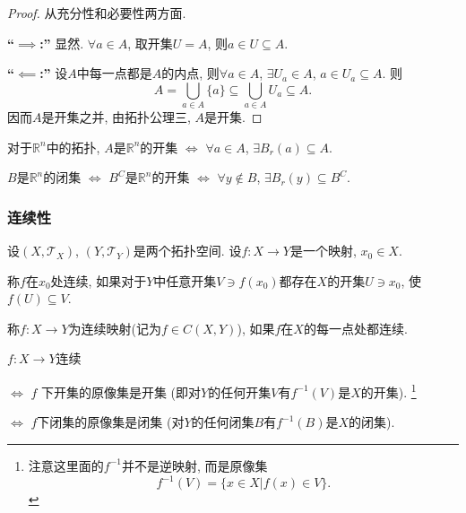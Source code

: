 \begin{proof}
    从充分性和必要性两方面.

    \textbf{``$\implies$:''} 显然. $\forall a \in A$, 取开集$U = A$, 则$a \in U \subseteq  A$.

    \textbf{``$\impliedby$:''} 设$A$中每一点都是$A$的内点, 则$\forall a \in A$, $\exists U_a \in A$, $a \in U_a \subseteq A$. 则
    \begin{equation}
      A = \bigcup_{a \in A} \{ a \} \subseteq \bigcup_{a \in A} U_a \subseteq A.
    \end{equation}
    因而$A$是开集之并, 由拓扑公理三, $A$是开集.
\end{proof}

对于$\mathbb{R}^{n}$中的拓扑, $A$是$\mathbb{R}^{n}$的开集 $\iff$ $\forall a \in A$, $\exists B_{r}\left( a \right) \subseteq A$.

$B$是$\mathbb{R}^{n}$的闭集 $\iff$ $B^{C}$是$\mathbb{R}^{n}$的开集 $\iff$ $\forall y \notin B$, $\exists B_{r}\left( y \right) \subseteq  B^{C}$.

\subsubsection{连续性}
\begin{definition}
    设$\left( X, \mathscr{T}_{X} \right) $, $\left( Y, \mathscr{T}_{Y} \right) $是两个拓扑空间. 设$f\colon X \to Y$是一个映射, $x_0 \in X$. 
    
    称$f$在$x_0$处连续, 如果对于$Y$中任意开集$V \ni f\left( x_0 \right) $都存在$X$的开集$U \ni x_0$, 使$f\left( U \right) \subseteq V$.
\end{definition}

\begin{definition}
    称$f\colon X \to Y$为连续映射(记为$f \in C \left( X , Y \right) $), 如果$f$在$X$的每一点处都连续.
\end{definition}

\begin{theorem}
    $f\colon X \to Y$连续 
    
    $\iff$ $f$ 下开集的原像集是开集 (即对$Y$的任何开集$V$有$f^{-1} \left( V \right) $是$X$的开集).
    \footnote{注意这里面的$f^{-1}$并不是逆映射, 而是原像集
    \begin{equation}
        f^{-1} \left( V \right)  = \{ x \in X | f\left( x \right) \in V \}.
    \end{equation}
    }
    
    $\iff$ $f$下闭集的原像集是闭集 (对$Y$的任何闭集$B$有$f^{-1}\left( B \right) $是$X$的闭集).
\end{theorem}


